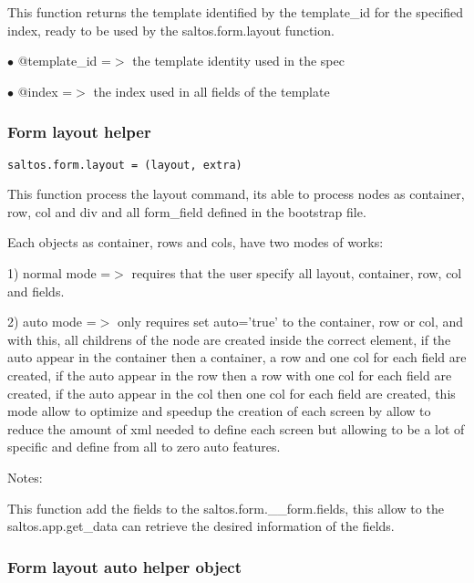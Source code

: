 \documentclass[a4paper]{article}
\begin{document}
This function returns the template identified by the template\_id for the specified index, ready
to be used by the saltos.form.layout function.

\begin{compactitem}
\item[\color{myblue}$\bullet$] @template\_id =$>$ the template identity used in the spec
\item[\color{myblue}$\bullet$] @index       =$>$ the index used in all fields of the template
\end{compactitem}

\hypertarget{toc779}{}
\subsubsection{Form layout helper}

\begin{lstlisting}
saltos.form.layout = (layout, extra)
\end{lstlisting}

This function process the layout command, its able to process nodes as container, row, col and div
and all form\_field defined in the bootstrap file.

Each objects as container, rows and cols, have two modes of works:

1) normal mode =$>$ requires that the user specify all layout, container, row, col and fields.

2) auto mode =$>$ only requires set auto='true' to the container, row or col, and with this, all childrens
of the node are created inside the correct element, if the auto appear in the container then a container,
a row and one col for each field are created, if the auto appear in the row then a row with one col for
each field are created, if the auto appear in the col then one col for each field are created, this mode
allow to optimize and speedup the creation of each screen by allow to reduce the amount of xml needed
to define each screen but allowing to be a lot of specific and define from all to zero auto features.

Notes:

This function add the fields to the saltos.form.\_\_form.fields, this allow to the saltos.app.get\_data
can retrieve the desired information of the fields.

\hypertarget{toc780}{}
\subsubsection{Form layout auto helper object}
\end{document}
